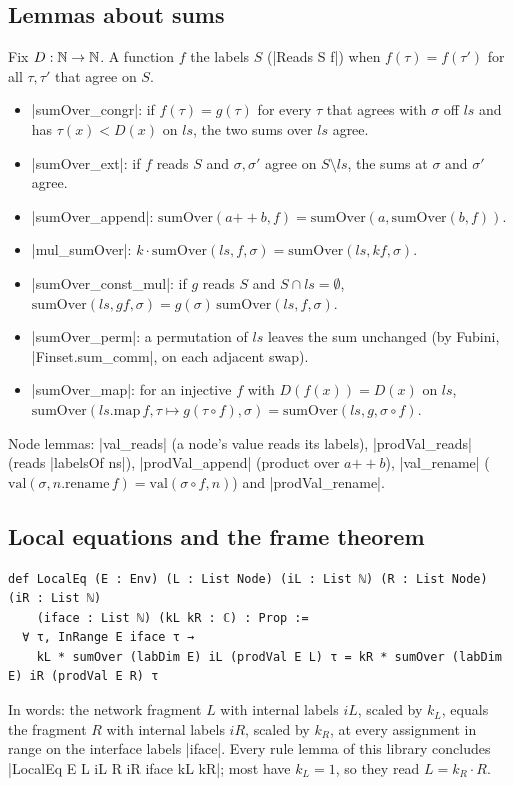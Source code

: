 \subsection{Lemmas about sums}\label{sec:lean-core-net-sums}

Fix $D:\mathbb{N}\to\mathbb{N}$. A function $f$  the labels $S$ (\lean|Reads S f|) when
$f(\tau)=f(\tau')$ for all $\tau,\tau'$ that agree on $S$.
\begin{itemize}
\item \lean|sumOver_congr|: if $f(\tau)=g(\tau)$ for every $\tau$ that agrees with $\sigma$ off $ls$
  and has $\tau(x)<D(x)$ on $ls$, the two sums over $ls$ agree.
\item \lean|sumOver_ext|: if $f$ reads $S$ and $\sigma,\sigma'$ agree on $S\setminus ls$, the sums at
  $\sigma$ and $\sigma'$ agree.
\item \lean|sumOver_append|: $\mathrm{sumOver}(a\mathbin{+\!\!+}b,f)=\mathrm{sumOver}(a,\mathrm{sumOver}(b,f))$.
\item \lean|mul_sumOver|: $k\cdot\mathrm{sumOver}(ls,f,\sigma)=\mathrm{sumOver}(ls,k f,\sigma)$.
\item \lean|sumOver_const_mul|: if $g$ reads $S$ and $S\cap ls=\emptyset$,
  $\mathrm{sumOver}(ls,g f,\sigma)=g(\sigma)\,\mathrm{sumOver}(ls,f,\sigma)$.
\item \lean|sumOver_perm|: a permutation of $ls$ leaves the sum unchanged (by Fubini,
  \lean|Finset.sum_comm|, on each adjacent swap).
\item \lean|sumOver_map|: for an injective $f$ with $D(f(x))=D(x)$ on $ls$,
  $\mathrm{sumOver}(ls.\mathrm{map}\,f,\tau\mapsto g(\tau\circ f),\sigma)=\mathrm{sumOver}(ls,g,\sigma\circ f)$.
\end{itemize}
Node lemmas: \lean|val_reads| (a node's value reads its labels), \lean|prodVal_reads| (reads
\lean|labelsOf ns|), \lean|prodVal_append| (product over $a\mathbin{+\!\!+}b$),
\lean|val_rename| ($\mathrm{val}(\sigma,n.\mathrm{rename}\,f)=\mathrm{val}(\sigma\circ f,n)$) and
\lean|prodVal_rename|.

\subsection{Local equations and the frame theorem}\label{sec:lean-core-net-frame}

\begin{definition}\label{def:lean-core-localeq}
\begin{lstlisting}[style=leancore]
def LocalEq (E : Env) (L : List Node) (iL : List ℕ) (R : List Node) (iR : List ℕ)
    (iface : List ℕ) (kL kR : ℂ) : Prop :=
  ∀ τ, InRange E iface τ →
    kL * sumOver (labDim E) iL (prodVal E L) τ = kR * sumOver (labDim E) iR (prodVal E R) τ
\end{lstlisting}
In words: the network fragment $L$ with internal labels $iL$, scaled by $k_L$, equals the fragment
$R$ with internal labels $iR$, scaled by $k_R$, at every assignment in range on the interface labels
\lean|iface|. Every rule lemma of this library concludes \lean|LocalEq E L iL R iR iface kL kR|;
most have $k_L=1$, so they read $L=k_R\cdot R$.
\end{definition}

